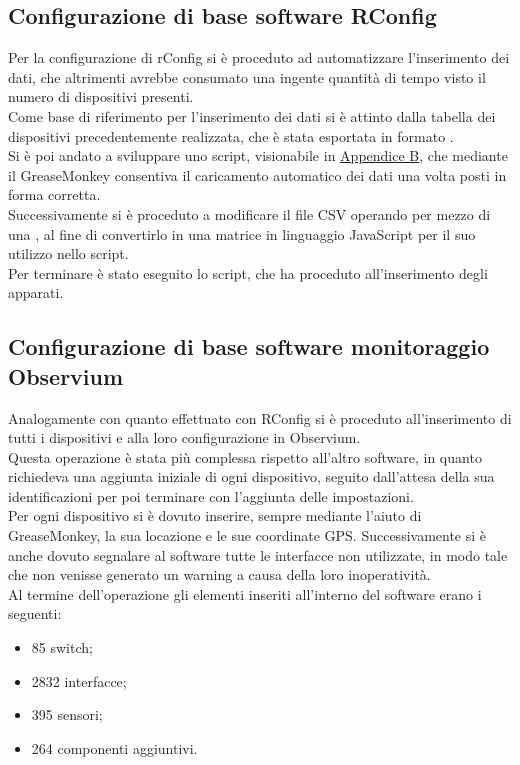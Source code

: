 \documentclass[Realizzazione.tex]{subfiles}
\begin{document}
\subsection{Configurazione di base software RConfig}
Per la configurazione di rConfig si è proceduto ad automatizzare l'inserimento dei dati, che altrimenti avrebbe consumato una ingente quantità di tempo visto il numero di dispositivi presenti. \\
Come base di riferimento per l'inserimento dei dati si è attinto dalla tabella dei dispositivi 
precedentemente realizzata, che è stata esportata in formato .\\
Si è poi andato a sviluppare uno script, visionabile in \hyperref[sec:Appendice B]{Appendice B}, che mediante il GreaseMonkey consentiva il caricamento automatico dei dati una volta posti in forma corretta. \\
Successivamente si è proceduto a modificare il file CSV operando per mezzo di una , al fine di convertirlo in una matrice in linguaggio JavaScript per il suo utilizzo nello script. \\
Per terminare è stato eseguito lo script, che ha proceduto all'inserimento degli apparati. \\

\subsection{Configurazione di base software monitoraggio Observium}
Analogamente con quanto effettuato con RConfig si è proceduto all'inserimento di tutti i dispositivi e alla loro configurazione in Observium. \\
Questa operazione è stata più complessa rispetto all'altro software, in quanto richiedeva una aggiunta iniziale di ogni dispositivo, seguito dall'attesa della sua identificazioni per poi terminare con l'aggiunta delle impostazioni. \\
Per ogni dispositivo si è dovuto inserire, sempre mediante l'aiuto di GreaseMonkey, la sua locazione e le sue coordinate GPS. Successivamente si è anche dovuto segnalare al software tutte le interfacce non utilizzate, in modo tale che non venisse generato un warning a causa della loro inoperatività.\\

Al termine dell'operazione gli elementi inseriti all'interno del software erano i seguenti:
\begin{itemize}
	\item 85 switch;
	\item 2832 interfacce;
	\item 395 sensori;
	\item 264 componenti aggiuntivi.
\end{itemize}
\end{document}
